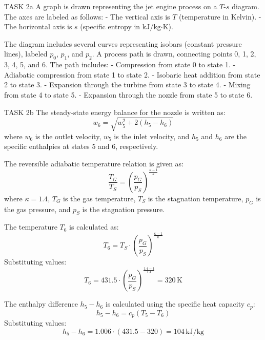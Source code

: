 TASK 2a  
A graph is drawn representing the jet engine process on a \( T \)-\( s \) diagram. The axes are labeled as follows:  
- The vertical axis is \( T \) (temperature in Kelvin).  
- The horizontal axis is \( s \) (specific entropy in \( \text{kJ}/\text{kg·K} \)).  

The diagram includes several curves representing isobars (constant pressure lines), labeled \( p_0 \), \( p_1 \), and \( p_2 \). A process path is drawn, connecting points 0, 1, 2, 3, 4, 5, and 6. The path includes:  
- Compression from state 0 to state 1.  
- Adiabatic compression from state 1 to state 2.  
- Isobaric heat addition from state 2 to state 3.  
- Expansion through the turbine from state 3 to state 4.  
- Mixing from state 4 to state 5.  
- Expansion through the nozzle from state 5 to state 6.  

TASK 2b  
The steady-state energy balance for the nozzle is written as:  
\[
w_6 = \sqrt{w_5^2 + 2(h_5 - h_6)}
\]  
where \( w_6 \) is the outlet velocity, \( w_5 \) is the inlet velocity, and \( h_5 \) and \( h_6 \) are the specific enthalpies at states 5 and 6, respectively.  

The reversible adiabatic temperature relation is given as:  
\[
\frac{T_G}{T_S} = \left( \frac{p_G}{p_S} \right)^{\frac{\kappa - 1}{\kappa}}
\]  
where \( \kappa = 1.4 \), \( T_G \) is the gas temperature, \( T_S \) is the stagnation temperature, \( p_G \) is the gas pressure, and \( p_S \) is the stagnation pressure.  

The temperature \( T_6 \) is calculated as:  
\[
T_6 = T_S \cdot \left( \frac{p_G}{p_S} \right)^{\frac{\kappa - 1}{\kappa}}
\]  
Substituting values:  
\[
T_6 = 431.5 \cdot \left( \frac{p_G}{p_S} \right)^{\frac{1.4 - 1}{1.4}} = 320 \, \text{K}
\]  

The enthalpy difference \( h_5 - h_6 \) is calculated using the specific heat capacity \( c_p \):  
\[
h_5 - h_6 = c_p (T_5 - T_6)
\]  
Substituting values:  
\[
h_5 - h_6 = 1.006 \cdot (431.5 - 320) = 104 \, \text{kJ/kg}
\]